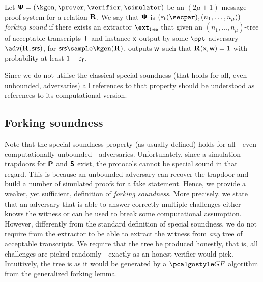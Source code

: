 \begin{definition}
  Let $\proofsystem = (\kgen, \prover, \verifier, \simulator)$ be an
  $(2 \mu + 1)$-message proof system for a relation $\mathbf{R}$. We say that
  $\bm{\mathsf{\Psi}}$ is $(\epsss(\secpar), (n_1, \ldots, n_\mu))$-\emph{forking sound}
  if there exists an extractor $\extt$ that given an $(n_1, \ldots, n_\mu)$-tree
  of acceptable transcripts $\mathsf{T}$ and instance $\mathsf{x}$ output by some $\ppt$ adversary $\adv(\REL,
  \srs)$, for $\srs \sample \kgen(\REL)$, outputs $\mathsf{w}$ such that $\mathbf{R}(\mathsf{x},
  \mathsf{w}) = 1$ with probability at least $1 - \varepsilon_{\mathsf{f}}$.
\end{definition}

Since we do not utilise the classical special soundness (that holds for all,
even unbounded, adversaries) all references to that property should be
understood as references to its computational version.
\fi

\subsection{Forking soundness}
Note that the special soundness property (as usually defined) holds for
all---even computationally unbounded---adversaries. Unfortunately, since a
simulation trapdoors for $\bm{\mathsf{P}}$ and $\bm{\mathsf{S}}$ exist, the protocols
cannot be special sound in that regard. This is because an unbounded adversary
can recover the trapdoor and build a number of simulated proofs for a fake
statement. Hence, we provide a weaker, yet sufficient, definition of
\emph{forking soundness}. More precisely, we state that an
adversary that is able to answer correctly multiple challenges either knows the
witness or can be used to break some computational assumption.
However, differently from the standard definition of special soundness, we do
not require from the extractor to be able to extract the witness from \emph{any}
tree of acceptable transcripts. We require that the tree be produced honestly,
that is, all challenges are picked randomly---exactly as an honest verifier would pick.
Intuitively, the tree is as it would be generated by a $\genforking$
algorithm from the generalized forking lemma.

